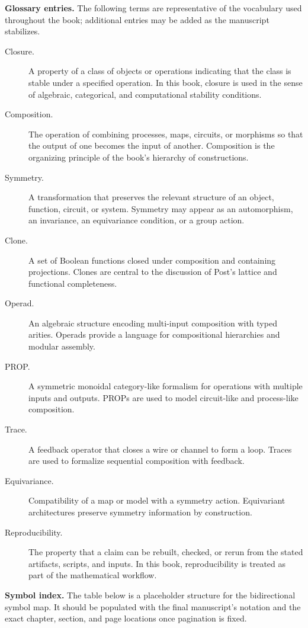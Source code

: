 \documentclass[11pt]{article}
\begin{document}
\medskip

\noindent\textbf{Glossary entries.} The following terms are representative of the vocabulary used throughout the book; additional entries may be added as the manuscript stabilizes.

\begin{description}
  \item[Closure.] A property of a class of objects or operations indicating that the class is stable under a specified operation. In this book, closure is used in the sense of algebraic, categorical, and computational stability conditions.
  \item[Composition.] The operation of combining processes, maps, circuits, or morphisms so that the output of one becomes the input of another. Composition is the organizing principle of the book's hierarchy of constructions.
  \item[Symmetry.] A transformation that preserves the relevant structure of an object, function, circuit, or system. Symmetry may appear as an automorphism, an invariance, an equivariance condition, or a group action.
  \item[Clone.] A set of Boolean functions closed under composition and containing projections. Clones are central to the discussion of Post's lattice and functional completeness.
  \item[Operad.] An algebraic structure encoding multi-input composition with typed arities. Operads provide a language for compositional hierarchies and modular assembly.
  \item[PROP.] A symmetric monoidal category-like formalism for operations with multiple inputs and outputs. PROPs are used to model circuit-like and process-like composition.
  \item[Trace.] A feedback operator that closes a wire or channel to form a loop. Traces are used to formalize sequential composition with feedback.
  \item[Equivariance.] Compatibility of a map or model with a symmetry action. Equivariant architectures preserve symmetry information by construction.
  \item[Reproducibility.] The property that a claim can be rebuilt, checked, or rerun from the stated artifacts, scripts, and inputs. In this book, reproducibility is treated as part of the mathematical workflow.
\end{description}

\medskip

\noindent\textbf{Symbol index.} The table below is a placeholder structure for the bidirectional symbol map. It should be populated with the final manuscript's notation and the exact chapter, section, and page locations once pagination is fixed.
\end{document}

